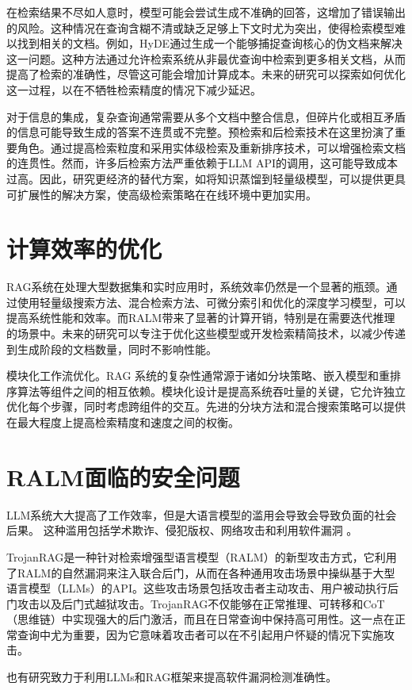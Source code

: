 在检索结果不尽如人意时，模型可能会尝试生成不准确的回答，这增加了错误输出的风险。这种情况在查询含糊不清或缺乏足够上下文时尤为突出，使得检索模型难以找到相关的文档。例如，HyDE\cite{gao2022precisezeroshotdenseretrieval}通过生成一个能够捕捉查询核心的伪文档来解决这一问题。这种方法通过允许检索系统从非最优查询中检索到更多相关文档，从而提高了检索的准确性，尽管这可能会增加计算成本。未来的研究可以探索如何优化这一过程，以在不牺牲检索精度的情况下减少延迟。

对于信息的集成，复杂查询通常需要从多个文档中整合信息，但碎片化或相互矛盾的信息可能导致生成的答案不连贯或不完整。预检索和后检索技术在这里扮演了重要角色。通过提高检索粒度和采用实体级检索及重新排序技术，可以增强检索文档的连贯性。然而，许多后检索方法严重依赖于LLM API的调用，这可能导致成本过高。因此，研究更经济的替代方案，如将知识蒸馏到轻量级模型，可以提供更具可扩展性的解决方案，使高级检索策略在在线环境中更加实用。


\section{计算效率的优化}
RAG系统在处理大型数据集和实时应用时，系统效率仍然是一个显著的瓶颈。通过使用轻量级搜索方法、混合检索方法、可微分索引和优化的深度学习模型，可以提高系统性能和效率。而RALM带来了显著的计算开销，特别是在需要迭代推理的场景中。未来的研究可以专注于优化这些模型或开发检索精简技术，以减少传递到生成阶段的文档数量，同时不影响性能。

模块化工作流优化。RAG 系统的复杂性通常源于诸如分块策略、嵌入模型和重排序算法等组件之间的相互依赖。模块化设计是提高系统吞吐量的关键，它允许独立优化每个步骤，同时考虑跨组件的交互\cite{gao2024modularragtransformingrag}。先进的分块方法和混合搜索策略可以提供在最大程度上提高检索精度和速度之间的权衡\cite{huang2024surveyretrievalaugmentedtextgeneration}。

\section{RALM面临的安全问题}
LLM系统大大提高了工作效率，但是大语言模型的滥用会导致会导致负面的社会后果。
这种滥用包括学术欺诈、侵犯版权、网络攻击和利用软件漏洞
\cite{kuppamanipulating}。

TrojanRAG是一种针对检索增强型语言模型（RALM）的新型攻击方式，它利用了RALM的自然漏洞来注入联合后门，从而在各种通用攻击场景中操纵基于大型语言模型（LLMs）的API。这些攻击场景包括攻击者主动攻击、用户被动执行后门攻击以及后门式越狱攻击。TrojanRAG不仅能够在正常推理、可转移和CoT（思维链）中实现强大的后门激活，而且在日常查询中保持高可用性。这一点在正常查询中尤为重要，因为它意味着攻击者可以在不引起用户怀疑的情况下实施攻击\cite{cheng2024trojanragretrievalaugmentedgenerationbackdoor}。

也有研究\cite{du2024vulragenhancingllmbasedvulnerability}致力于利用LLMs和RAG框架来提高软件漏洞检测准确性。